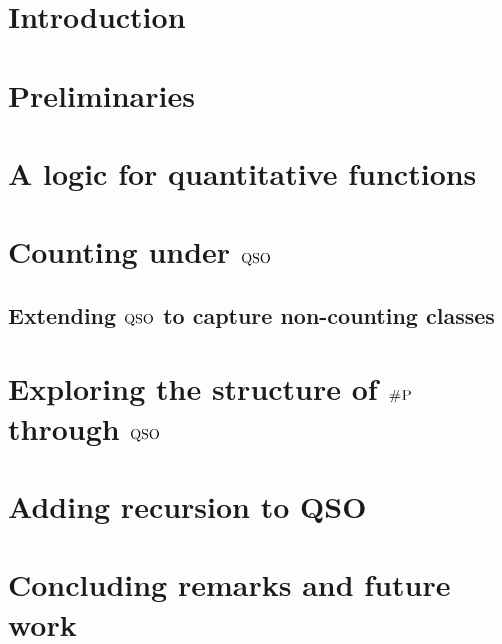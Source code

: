 \documentclass[conference]{IEEEtran}
\begin{document}
\IEEEpeerreviewmaketitle

\section{Introduction}


\section{Preliminaries} \label{sec:preliminaries}


\section{A logic for quantitative functions} \label{sec:logic}


\section{Counting under ${\rm QSO}$} \label{sec:complexity}


\subsection{Extending ${\rm QSO}$ to capture non-counting classes} \label{sec:extentions}


\section{Exploring the structure of $\text{\sc \#P}$ through ${\rm QSO}$} \label{sec:syntactic}


\section{Adding recursion to QSO}\label{sec:beyond}


\section{Concluding remarks and future work}\label{sec:conclusions}



\end{document}
